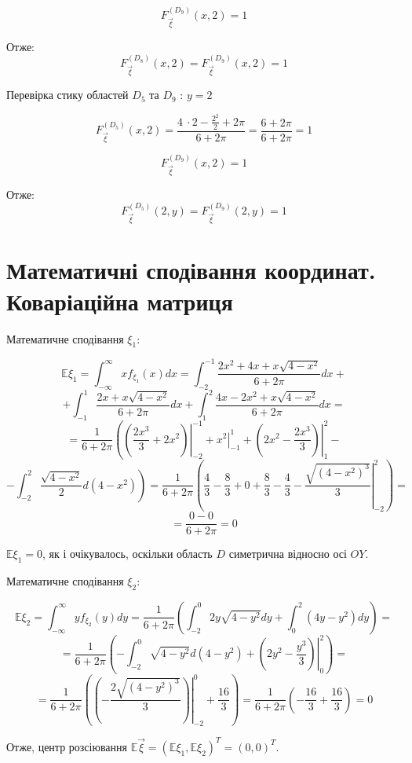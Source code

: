 \documentclass[14pt, a4paper, ukrainian]{extreport}
\begin{document}
	$$ F_{\vec\xi}^{\left({D_9}\right)}(x, 2) =  1
	$$
	
	Отже:	
	$$  F_{\vec\xi}^{\left({D_8}\right)}(x, 2) =  F_{\vec\xi}^{\left({D_9}\right)}(x, 2) = 1
	$$
	
	Перевірка стику областей $D_5$ та $D_9$ : $ y = 2$ 
	
	$$ F_{\vec\xi}^{\left({D_5}\right)}(x, 2) = \frac{4 \ \cdot 2 - \frac{2^2}{2} + 2\pi }{6 + 2\pi}= \frac{6 + 2\pi}{6 + 2\pi} = 1
	$$
	
	$$ F_{\vec\xi}^{\left({D_9}\right)}(x, 2) =  1
	$$
	
	Отже:	
	$$  F_{\vec\xi}^{\left({D_5}\right)}(2, y) =  F_{\vec\xi}^{\left({D_9}\right)}(2, y) = 1
	$$
	
		
	\section{Математичні сподівання координат. Коваріаційна матриця}
	
	Математичне сподівання $\xi_1$:
	
	$$\mathbb{E}\xi_1 = \int_{-\infty}^{\infty}xf_{\xi_1}(x)dx = \int_{-2}^{-1}\frac{2x^2 + 4x + x\sqrt{4-x^2}}{6+2\pi}dx +
	$$
	$$ + \int_{-1}^{1}\frac{2x + x\sqrt{4-x^2}}{6+2\pi}dx + \int_{1}^{2}\frac{4x-2x^2 + x\sqrt{4-x^2}}{6+2\pi}dx =
	$$
	$$ = \frac{1}{6+2\pi}\left(\left.\left(\frac{2x^3}{3} + 2x^2 \right)\right|_{-2}^{-1} + \left.{x^2}\right|_{-1}^{1} + \left.\left(2x^2 - \frac{2x^3}{3}\right)\right|_{1}^{2} - \right.$$
	$$ - \left.\int_{-2}^{2}\frac{\sqrt{4-x^2}}{2}d(4-x^2)\right) = 
	\frac{1}{6+2\pi} \left(\frac{4}{3} - \frac{8}{3} + 0 + \frac{8}{3} - \frac{4}{3} - \left. \frac{\sqrt{(4-x^2)^3}}{3}\right|_{-2}^2\right) =
	$$
	$$ = \frac{0 - 0}{6 + 2\pi} = 0
	$$
	
	$\mathbb{E}\xi_1 = 0$, як і очікувалось, оскільки область $D$ симетрична відносно осі $OY$.
	
	
	Математичне сподівання $\xi_2$:
	
	$$\mathbb{E}\xi_2 = \int_{-\infty}^{\infty}yf_{\xi_2}(y)dy =\frac{1}{6+2\pi}\left(\int_{-2}^{0}2y\sqrt{4-y^2}dy + \int_{0}^{2}(4y-y^2)dy\right) = 
	$$
	$$ = \frac{1}{6+2\pi}\left(-\int_{-2}^{0}\sqrt{4-y^2}d(4-y^2) + \left.\left(2y^2 - \frac{y^3}{3}\right)\right|_0^2\right) = 
	$$
	$$ = \frac{1}{6+2\pi}\left(\left.\left(-\frac{2\sqrt{(4-y^2)^3}}{3}\right)\right|_{-2}^0 + \frac{16}{3}\right) =
	 \frac{1}{6+2\pi}\left(-\frac{16}{3} + \frac{16}{3}\right) = 0
	$$
	
	Отже, центр розсіювання $\mathbb{E}\vec\xi = (\mathbb{E}\xi_1, \mathbb{E}\xi_2)^T = (0, 0)^T$.
	
\end{document}
